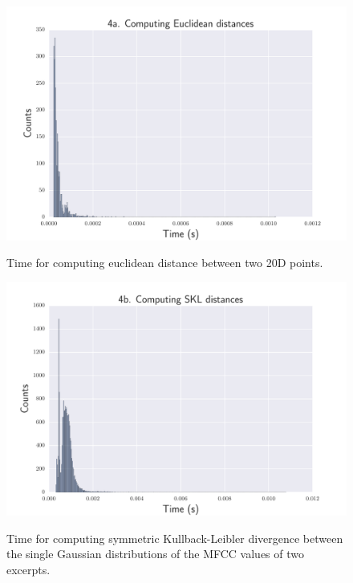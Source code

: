 \begin{figure}[htbp]
\begin{center}
\includegraphics[scale=0.6]{Figures/bench_euclidean.pdf}
  \caption[Time for computing euclidean distance]{Time for computing euclidean distance between two 20D points.}
  \label{fig:step4}
\vspace{1cm}
\includegraphics[scale=0.6]{Figures/bench_skl.pdf}
  \caption[Time for computing symmetric Kullback-Leibler distance]{Time for computing symmetric Kullback-Leibler divergence between the single Gaussian distributions of the MFCC values of two excerpts.}
  \label{fig:step5}
\end{center}
\end{figure}


